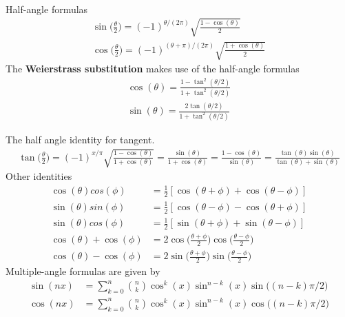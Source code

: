 \begin{multicols}{2}
\begin{align}
\end{align}
Half-angle formulas
\begin{align}
\sin\bigg(\frac{\theta}{2}\bigg)=(-1)^{\theta/(2\pi)}\sqrt{\frac{1-\cos(\theta)}{2}} \\
\cos\bigg(\frac{\theta}{2}\bigg)=(-1)^{(\theta+\pi)/(2\pi)}\sqrt{\frac{1+\cos(\theta)}{2}}
\end{align}
The \textbf{Weierstrass substitution} makes use of the half-angle formulas 
\begin{align}
\cos(\theta)=\frac{1-\tan^2(\theta/2)}{1+\tan^2(\theta/2)} \\
\sin(\theta)=\frac{2\tan(\theta/2)}{1+\tan^2(\theta/2)}
\end{align}
\end{multicols}
The half angle identity for tangent.
\begin{align}
\tan\bigg(\frac{\theta}{2}\bigg)=(-1)^{x/\pi}\sqrt{\frac{1-\cos(\theta)}{1+\cos(\theta)}} = \frac{\sin(\theta)}{1+\cos(\theta)}=\frac{1-\cos(\theta)}{\sin(\theta)}=\frac{\tan(\theta)\sin(\theta)}{\tan(\theta)+\sin(\theta)}
\end{align}
Other identities
\begin{align}
\cos(\theta)cos(\phi) &=\frac{1}{2}[\cos(\theta+\phi)+\cos(\theta-\phi)] \\
\sin(\theta)sin(\phi) &=\frac{1}{2}[\cos(\theta-\phi)-\cos(\theta+\phi)] \\
\sin(\theta)cos(\phi) &=\frac{1}{2}[\sin(\theta+\phi)+\sin(\theta-\phi)] \\
\cos(\theta)+\cos(\phi)&= 2\cos\bigg( \frac{\theta+\phi}{2}\bigg)\cos\bigg( \frac{\theta-\phi}{2}\bigg) \\
\cos(\theta)-\cos(\phi)&= 2\sin\bigg( \frac{\theta+\phi}{2}\bigg)\sin\bigg( \frac{\theta-\phi}{2}\bigg)
\end{align}
Multiple-angle formulas are given by 
\begin{align}
\sin(nx)&= \sum_{k=0}^{n}{{n}\choose{k}}\cos^k(x)\sin^{n-k}(x)\sin\big((n-k)\pi/2 \big) \\
\cos(nx)&= \sum_{k=0}^{n}{{n}\choose{k}}\cos^k(x)\sin^{n-k}(x)\cos\big((n-k)\pi/2 \big)
\end{align}








